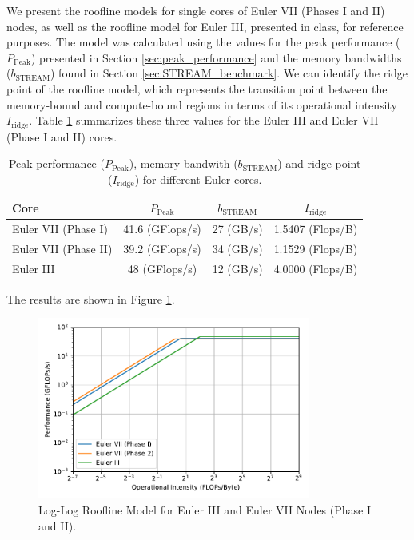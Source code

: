 \documentclass[unicode,11pt,a4paper,oneside,numbers=endperiod,openany]{scrartcl}
\begin{document}
We present the roofline models for single cores of Euler VII (Phases I 
and II) nodes, as well as the roofline model for Euler III, presented in class, for reference 
purposes. 
The model was calculated using the values for the peak performance ($P_{\text{Peak}}$) 
presented in Section \ref{sec:peak_performance} and the memory bandwidths ($b_{\text{STREAM}}$) found in
Section \ref{sec:STREAM_benchmark}.
We can identify the ridge point of the roofline model, which represents the transition point between
the memory-bound and compute-bound regions in terms of its operational intensity $I_{\text{ridge}}$. 
Table \ref{tab:ridge_point} summarizes these three values for the Euler III and Euler VII (Phase I and II) cores.
\begin{table}[htbp]
    \centering
    \caption{Peak performance ($P_{\text{Peak}}$), memory bandwith ($b_{\text{STREAM}}$) and ridge point ($I_{\text{ridge}}$)
    for different Euler cores.}
    \begin{tabular}{||lccc||}
        \hline
        Core & $P_{\text{Peak}}$ & $b_{\text{STREAM}}$ & $I_{\text{ridge}}$ \\
        \hline
        \hline
        Euler VII (Phase I) & 41.6  (GFlops/s) & 27 (GB/s) & 1.5407 (Flops/B) \\
        Euler VII (Phase II) & 39.2 (GFlops/s)  & 34 (GB/s) & 1.1529 (Flops/B) \\
        Euler III & 48 (GFlops/s)  & 12 (GB/s) & 4.0000 (Flops/B) \\
        \hline
    \end{tabular}\label{tab:ridge_point}
\end{table}
The results are shown in Figure \ref{fig:roofline}.
\begin{figure}[htbp]
    \centering
    \includegraphics[width=0.8\textwidth]{../roofline/roofline.pdf}
    \caption{Log-Log Roofline Model for Euler III and Euler VII Nodes (Phase I and II).}
    \label{fig:roofline}
\end{figure}
\end{document}
